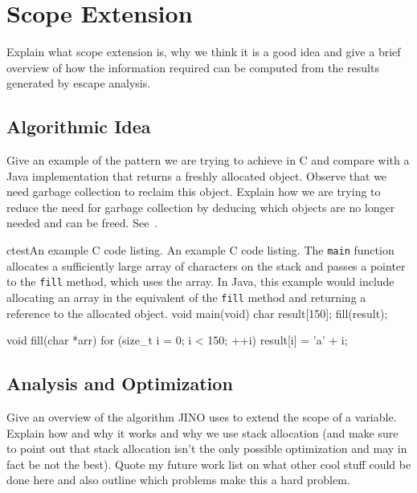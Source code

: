 
\chapter{Scope Extension}
	\label{chapter:scopeext}
	Explain what scope extension is, why we think it is a good idea and give a brief overview of how the information
	required can be computed from the results generated by escape analysis.

	\section{Algorithmic Idea}
		\label{sec:scopeext:idea}
		Give an example of the pattern we are trying to achieve in C and compare with a Java implementation that returns
		a freshly allocated object. Observe that we need garbage collection to reclaim this object. Explain how we are
		trying to reduce the need for garbage collection by deducing which objects are no longer needed and can be freed.
		See~.

		\begin{thesiscode}[gobble=4]{c}{test}{An example C code listing.}{%
				An example C code listing. The \texttt{main} function allocates a sufficiently large array of characters on the
				stack and passes a pointer to the \texttt{fill} method, which uses the array. In Java, this example would
				include allocating an array in the equivalent of the \texttt{fill} method and returning a reference to the
				allocated object.
			}
				void main(void) {
					char result[150];
					fill(result);
				}

				void fill(char *arr) {
					for (size_t i = 0; i < 150; ++i) {
						result[i] = 'a' + i;
					}
				}\end{thesiscode}

	\section{Analysis and Optimization}
		\label{sec:scopeext:analysis}
		Give an overview of the algorithm JINO uses to extend the scope of a variable. Explain how and why it works and why
		we use stack allocation (and make sure to point out that stack allocation isn't the only possible optimization and
		may in fact be not the best). Quote my future work list on what other cool stuff could be done here and also outline
		which problems make this a hard problem.


